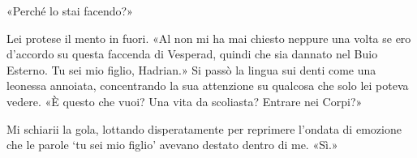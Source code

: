 «Perché lo stai facendo?»

Lei protese il mento in fuori. «Al non mi ha mai chiesto neppure una
volta se ero d'accordo su questa faccenda di Vesperad, quindi che sia
dannato nel Buio Esterno. Tu sei mio figlio, Hadrian.» Si passò la
lingua sui denti come una leonessa annoiata, concentrando la sua
attenzione su qualcosa che solo lei poteva vedere. «È questo che vuoi?
Una vita da scoliasta? Entrare nei Corpi?»

Mi schiarii la gola, lottando disperatamente per reprimere l'ondata di
emozione che le parole `tu sei mio figlio' \emph{} avevano destato
dentro di me. «Sì.»

